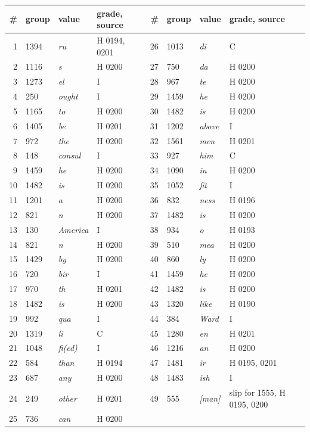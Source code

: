 \documentclass[]{interact}
\begin{document}
\begin{table}
{\small\begin{tabular}{@{}rlll@{\qquad}rlll@{}}
\toprule
\# & group & value & grade, source & \# & group & value & grade, source \\
\midrule
1 & 1394 & \emph{ru} & H 0194, 0201 & 26 & 1013 & \emph{di} & C \\
2 & 1116 & \emph{s} & H 0200 & 27 & 750 & \emph{da} & H 0200 \\
3 & 1273 & \emph{el} & I & 28 & 967 & \emph{te} & H 0200 \\
4 & 250 & \emph{ought} & I & 29 & 1459 & \emph{he} & H 0200 \\
5 & 1165 & \emph{to} & H 0200 & 30 & 1482 & \emph{is} & H 0200 \\
6 & 1405 & \emph{be} & H 0201 & 31 & 1202 & \emph{above} & I \\
7 & 972 & \emph{the} & H 0200 & 32 & 1561 & \emph{men} & H 0201 \\
8 & 148 & \emph{consul} & I & 33 & 927 & \emph{him} & C \\
9 & 1459 & \emph{he} & H 0200 & 34 & 1090 & \emph{in} & H 0200 \\
10 & 1482 & \emph{is} & H 0200 & 35 & 1052 & \emph{fit} & I \\
11 & 1201 & \emph{a} & H 0200 & 36 & 832 & \emph{ness} & H 0196 \\
12 & 821 & \emph{n} & H 0200 & 37 & 1482 & \emph{is} & H 0200 \\
13 & 130 & \emph{America} & I & 38 & 934 & \emph{o} & H 0193 \\
14 & 821 & \emph{n} & H 0200 & 39 & 510 & \emph{mea} & H 0200 \\
15 & 1429 & \emph{by} & H 0200 & 40 & 860 & \emph{ly} & H 0200 \\
16 & 720 & \emph{bir} & I & 41 & 1459 & \emph{he} & H 0200 \\
17 & 970 & \emph{th} & H 0201 & 42 & 1482 & \emph{is} & H 0200 \\
18 & 1482 & \emph{is} & H 0200 & 43 & 1320 & \emph{like} & H 0190 \\
19 & 992 & \emph{qua} & I & 44 & 384 & \emph{Ward} & I \\
20 & 1319 & \emph{li} & C & 45 & 1280 & \emph{en} & H 0201 \\
21 & 1048 & \emph{fi(ed)} & I & 46 & 1216 & \emph{an} & H 0200 \\
22 & 584 & \emph{than} & H 0194 & 47 & 1481 & \emph{ir} & H 0195, 0201 \\
23 & 687 & \emph{any} & H 0200 & 48 & 1483 & \emph{ish} & I \\
24 & 249 & \emph{other} & H 0201 & 49 & 555 & \emph{[man]} & slip for 1555, H 0195, 0200 \\
25 & 736 & \emph{can} & H 0200 & & & & \\
\bottomrule
\end{tabular}}
\label{tab:ps}
\end{table}
\end{document}
